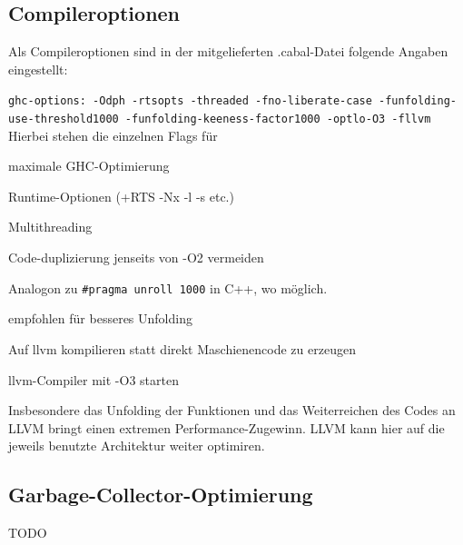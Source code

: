 \documentclass[a4paper]{scrartcl}
\begin{document}
\subsection{Compileroptionen}
Als Compileroptionen sind in der mitgelieferten .cabal-Datei folgende Angaben eingestellt:\par
\texttt{ghc-options: -Odph -rtsopts -threaded -fno-liberate-case -funfolding-use-threshold1000 -funfolding-keeness-factor1000 -optlo-O3 -fllvm}
Hierbei stehen die einzelnen Flags für
\begin{description}[style=multiline,leftmargin=6.5cm,font=\ttfamily\bfseries]
 \item[-Odph] maximale GHC-Optimierung
 \item[-rtsopts] Runtime-Optionen (+RTS -Nx -l -s etc.)
 \item[-threaded] Multithreading
 \item[-fno-liberate-case] Code-duplizierung jenseits von -O2 vermeiden
 \item[-funfolding-use-threshold1000] Analogon zu \texttt{\#pragma unroll 1000} in C++, wo möglich.
 \item[-funfolding-keeness-factor1000] empfohlen für besseres Unfolding
 \item[-fllvm] Auf llvm kompilieren statt direkt Maschienencode zu erzeugen
 \item[-optlo-O3] llvm-Compiler mit -O3 starten
\end{description}
Insbesondere das Unfolding der Funktionen und das Weiterreichen des Codes an LLVM bringt einen extremen Performance-Zugewinn. LLVM kann hier auf die jeweils benutzte Architektur weiter optimiren.

\subsection{Garbage-Collector-Optimierung}
TODO
\end{document}
